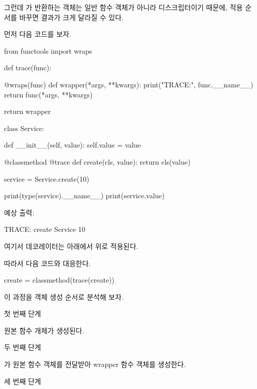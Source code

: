 그런데 가 반환하는 객체는 일반 함수 객체가 아니라 디스크립터이기 때문에, 적용 순서를 바꾸면 결과가 크게 달라질 수 있다.

먼저 다음 코드를 보자.

\begin{dhkcode}
from functools import wraps


def trace(func):

    @wraps(func)
    def wrapper(*args, **kwargs):
        print("TRACE:", func.__name__)
        return func(*args, **kwargs)

    return wrapper


class Service:

    def __init__(self, value):
        self.value = value

    @classmethod
    @trace
    def create(cls, value):
        return cls(value)


service = Service.create(10)

print(type(service).__name__)
print(service.value)
\end{dhkcode}

예상 출력:

\begin{dhkzsh}
TRACE: create
Service
10
\end{dhkzsh}

여기서 데코레이터는 아래에서 위로 적용된다.

따라서 다음 코드와 대응한다.

\begin{dhkcode}
create = classmethod(trace(create))
\end{dhkcode}

이 과정을 객체 생성 순서로 분석해 보자.

\begin{dhknote}
\begin{dhksmry}[centered]
첫 번째 단계
\end{dhksmry}
\end{dhknote}

원본  함수 개체가 생성된다.

\begin{dhknote}
\begin{dhksmry}[centered]
두 번째 단계
\end{dhksmry}
\end{dhknote}

가 원본 함수 객체를 전달받아 wrapper 함수 객체를 생성한다.

\begin{dhknote}
\begin{dhksmry}[centered]
세 번째 단계
\end{dhksmry}
\end{dhknote}

